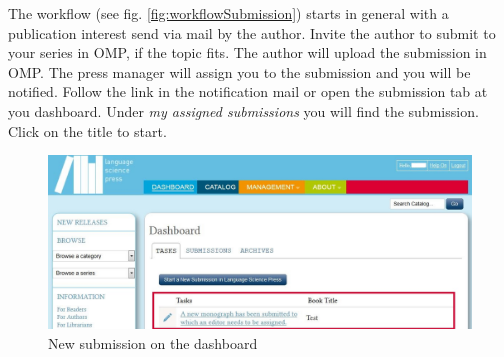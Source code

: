 The workflow (see fig. \ref{fig:workflowSubmission}) starts in general with a publication interest send via mail by the author. Invite the author to submit to your series in OMP, if the topic fits. The author will upload the submission in OMP. The press manager will assign you to the submission and you will be notified. Follow the link in the notification mail or open the submission tab at you dashboard. Under \textit{my assigned submissions} you will find the submission. Click on the title to start. 

\begin{figure}[h] \centering
\includegraphics[width=1\textwidth]{./img/editor-1.jpg} \caption{New submission on the dashboard}
\label{fig:editor1}
\end{figure}







